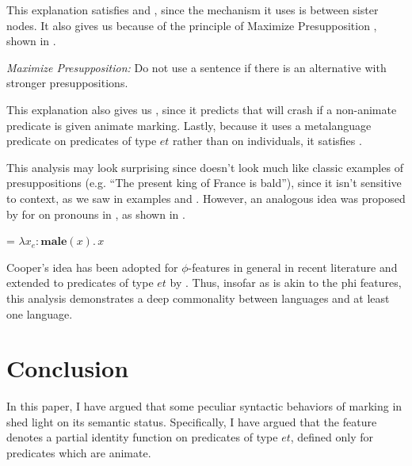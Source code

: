 \documentclass[output=paper
,newtxmath
,modfonts
,nonflat]{langsci/langscibook}
\begin{document}
This explanation satisfies  and , since the mechanism it uses is  between sister nodes.  It also gives us  because of the principle of Maximize Presupposition \citep{heim91}, shown in .

\ea\label{ex:pesetsky:maximize} \textit{Maximize Presupposition:} Do not use a sentence if there is an alternative with stronger presuppositions. \z

This explanation also gives us , since it predicts that  will crash if a non-animate predicate is given animate marking.  Lastly, because it uses a metalanguage predicate on predicates of type $et$ rather than on individuals, it satisfies .

This analysis may look surprising since  doesn't look much like classic examples of presuppositions (e.g. ``The present king of France is bald''), since it isn't sensitive to context, as we saw in examples  and . However, an analogous idea was proposed by \citet{cooper83} for  on pronouns in , as shown in .

\ea\label{ex:pesetsky:cooper}  = $\lambda x_e : \textbf{male}(x). \, x$ \z

Cooper's idea has been adopted for $\phi$-features in general in recent literature \citep{hnk91, sauerland08, heim08} and extended to predicates of type $et$ by \citet{merchant14}. Thus, insofar as  is akin to the phi features, this analysis demonstrates a deep commonality between  languages and at least one  language.

 \section{Conclusion} \label{sec:pesetsky:concludesection}

In this paper, I have argued that some peculiar syntactic behaviors of  marking in  shed light on its semantic status.  Specifically, I have argued that the  feature denotes a partial identity function on predicates of type $et$, defined only for predicates which are animate. 
\end{document}
